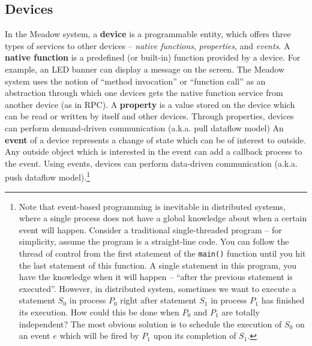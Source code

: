\documentclass{note}
\begin{document}
\subsection{Devices}
In the Meadow system, a \textcolor{blue2}{\bf device} is a programmable
entity, which offers
three types of services to other devices -- {\em native functions\/},
{\em properties\/}, and {\em events\/}. 
A \textcolor{blue2}{\bf native function} is 
a predefined (or built-in) function provided by a device. 
For example, an LED banner can display a message on the screen. 
The Meadow system uses the notion of ``method invocation'' or ``function
call'' as an abstraction through which one devices gets the native function
service from another device (as in RPC).
A \textcolor{blue2}{\bf property} is a value stored on the device which can be
read or written by itself and other devices. Through properties, devices
can perform demand-driven communication (a.k.a. pull dataflow model)
An \textcolor{blue2}{\bf event} of a device represents a change of state 
which can be of interest to outside. Any outside object which is interested in
the event can add a callback process to the event. 
Using events, devices can perform data-driven communication (a.k.a. push
dataflow model).\footnote{Note that event-based programming is inevitable in
  distributed systems, where a single process does not have a global knowledge
  about when a certain event will happen. Consider a traditional
  single-threaded program -- for simplicity, assume the program is a
  straight-line code. You can follow the thread of control from the first
  statement of the {\tt{}main()} function until you hit the last statement of
  this function. A single statement in this program,  you have the knowledge
  when it will happen -- ``after the previous statement is
  executed''. However, in distributed 
  system, sometimes we want to execute a statement $S_0$ in process $P_0$
  right after statement $S_1$ in process $P_1$ has finished its execution. 
  How could this be done when $P_0$ and $P_1$ are totally independent?
  The most obvious solution is to schedule the execution of $S_0$ on
  an event $e$ which will be fired by $P_1$ upon its completion of $S_1$.}
\end{document}

